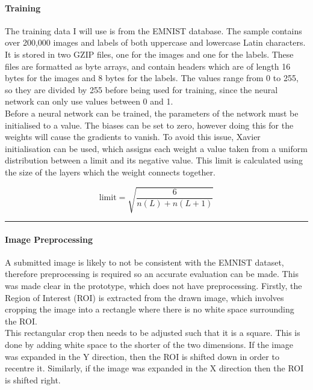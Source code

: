 \documentclass{article}
\begin{document}
\paragraph{Training\\}

The training data I will use is from the EMNIST database. The sample contains over 200,000 images and labels of both uppercase and lowercase Latin characters. It is stored in two GZIP files, one for the images and one for the labels. These files are formatted as byte arrays, and contain headers which are of length 16 bytes for the images and 8 bytes for the labels. The values range from 0 to 255, so they are divided by 255 before being used for training, since the neural network can only use values between 0 and 1. \\

Before a neural network can be trained, the parameters of the network must be initialised to a value. The biases can be set to zero, however doing this for the weights will cause the gradients to vanish. To avoid this issue, Xavier initialisation can be used, which assigns each weight a value taken from a uniform distribution between a limit and its negative value. This limit is calculated using the size of the layers which the weight connects together.

\begin{equation*}
    \text{limit}=\sqrt{\frac{6}{n(L)+n(L+1)}}
\end{equation*}

\begin{center}
\rule{0.5\linewidth}{0.4pt}
\end{center}

\paragraph{Image Preprocessing\\}

A submitted image is likely to not be consistent with the EMNIST dataset, therefore preprocessing is required so an accurate evaluation can be made. This was made clear in the prototype, which does not have preprocessing. Firstly, the Region of Interest (ROI) is extracted from the drawn image, which involves cropping the image into a rectangle where there is no white space surrounding the ROI.\@ \\

This rectangular crop then needs to be adjusted such that it is a square. This is done by adding white space to the shorter of the two dimensions. If the image was expanded in the Y direction, then the ROI is shifted down in order to recentre it. Similarly, if the image was expanded in the X direction then the ROI is shifted right. \\
\end{document}

